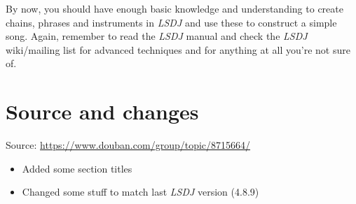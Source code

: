 \documentclass[]{article}
\newcommand{\lsdj}{\textit{LSDJ}\xspace}
\begin{document}
By now, you should have enough basic knowledge and understanding to create chains, phrases and instruments in \lsdj and use these to construct a simple song. Again, remember to read the \lsdj manual and check the \lsdj wiki/mailing list for advanced techniques and for anything at all you're not sure of.


\section*{Source and changes}

Source: \url{https://www.douban.com/group/topic/8715664/}

\begin{itemize}
	\item Added some section titles
	\item Changed some stuff to match last \lsdj version (4.8.9)
\end{itemize}
\end{document}
